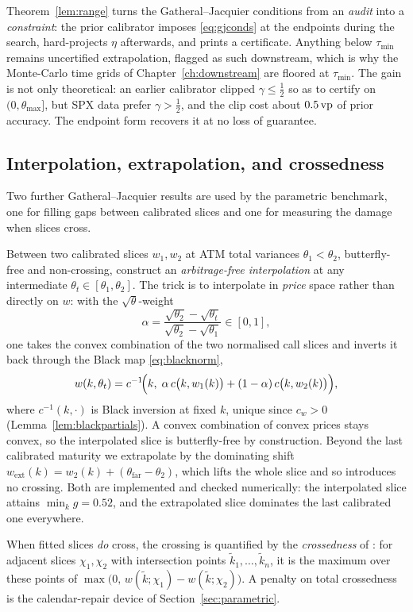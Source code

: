 \begin{remark}\label{rem:cert}
Theorem~\ref{lem:range} turns the Gatheral--Jacquier conditions from an \emph{audit} into a
\emph{constraint}: the prior calibrator imposes \eqref{eq:gjconds} at the endpoints during the
search, hard-projects $\eta$ afterwards, and prints a certificate. Anything below $\tau_{\min}$
remains uncertified extrapolation, flagged as such downstream, which is why the Monte-Carlo time
grids of Chapter~\ref{ch:downstream} are floored at $\tau_{\min}$. The gain is not only
theoretical: an earlier calibrator clipped $\gamma\le\tfrac12$ so as to certify on
$(0,\theta_{\max}]$, but SPX data prefer $\gamma>\tfrac12$, and the clip cost about
$0.5\,\text{vp}$ of prior accuracy. The endpoint form recovers it at no loss of guarantee.
\end{remark}

\subsection{Interpolation, extrapolation, and crossedness}

Two further Gatheral--Jacquier results are used by the parametric benchmark, one for filling
gaps between calibrated slices and one for measuring the damage when slices cross.

Between two calibrated slices $w_1,w_2$ at ATM total variances $\theta_1<\theta_2$,
butterfly-free and non-crossing, \cite[Lem.~5.1]{gatheraljacquier2014} construct an
\emph{arbitrage-free interpolation} at any intermediate $\theta_t\in[\theta_1,\theta_2]$. The
trick is to interpolate in \emph{price} space rather than directly on $w$: with the
$\sqrt{\theta}$-weight
\begin{equation}\label{eq:interp}
\alpha=\frac{\sqrt{\theta_2}-\sqrt{\theta_t}}{\sqrt{\theta_2}-\sqrt{\theta_1}}\in[0,1],
\end{equation}
one takes the convex combination of the two normalised call slices and inverts it back through
the Black map \eqref{eq:blacknorm},
\begin{equation}\label{eq:interp2}
w(k,\theta_t)=c^{-1}\!\Bigl(k,\;\alpha\,c\bigl(k,w_1(k)\bigr)+(1-\alpha)\,c\bigl(k,w_2(k)\bigr)\Bigr),
\end{equation}
where $c^{-1}(k,\cdot)$ is Black inversion at fixed $k$, unique since $c_w>0$
(Lemma~\ref{lem:blackpartials}). A convex combination of convex prices stays convex, so the
interpolated slice is butterfly-free by construction. Beyond the last calibrated maturity we
extrapolate by the dominating shift
$w_{\mathrm{ext}}(k)=w_2(k)+(\theta_{\mathrm{far}}-\theta_2)$, which lifts the whole slice and
so introduces no crossing. Both are implemented and checked numerically: the interpolated slice
attains $\min_k g=0.52$, and the extrapolated slice dominates the last calibrated one
everywhere.

When fitted slices \emph{do} cross, the crossing is quantified by the \emph{crossedness} of
\cite[Def.~5.1]{gatheraljacquier2014}: for adjacent slices $\chi_1,\chi_2$ with intersection
points $\tilde k_1,\dots,\tilde k_n$, it is the maximum over these points of
$\max\bigl(0,\,w(\tilde k;\chi_1)-w(\tilde k;\chi_2)\bigr)$. A penalty on total crossedness is
the calendar-repair device of Section~\ref{sec:parametric}.